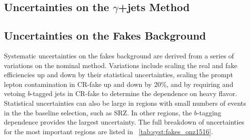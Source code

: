 
\subsection{Uncertainties on the $\gamma$+jets Method}


\subsection{Uncertainties on the Fakes Background}

Systematic uncertainties on the fakes background are derived from a series of variations on the nominal method.  Variations include scaling the real and fake efficiencies up and down by their statistical uncertainties, scaling the prompt lepton contamination in CR-fake up and down by 20\%, and by requiring and vetoing $b$-tagged jets in CR-fake to determine the dependence on heavy flavor. 
Statistical uncertainties can also be large in regions with small numbers of events in the the baseline selection, such as SRZ. In other regions, the $b$-tagging dependence provides the largest uncertainty. The full breakdown of uncertainties for the most important regions are listed in ~\autoref{tab:syst:fakes_onz1516}.

